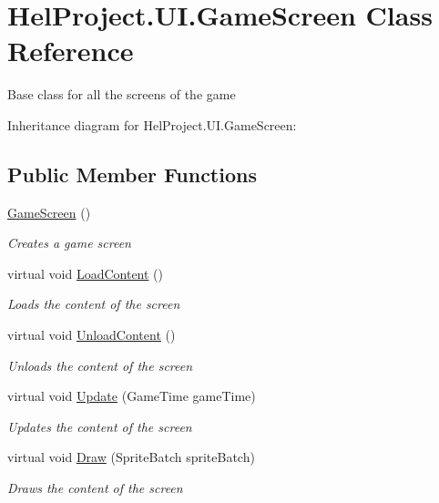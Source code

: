 \hypertarget{class_hel_project_1_1_u_i_1_1_game_screen}{}\section{Hel\+Project.\+U\+I.\+Game\+Screen Class Reference}
\label{class_hel_project_1_1_u_i_1_1_game_screen}


Base class for all the screens of the game  




Inheritance diagram for Hel\+Project.\+U\+I.\+Game\+Screen\+:
\subsection*{Public Member Functions}
\begin{DoxyCompactItemize}
\item 
\hyperlink{class_hel_project_1_1_u_i_1_1_game_screen_a2061db8e78d29a972883b7e3fb47d71c}{Game\+Screen} ()
\begin{DoxyCompactList}\small\item\em Creates a game screen \end{DoxyCompactList}\item 
virtual void \hyperlink{class_hel_project_1_1_u_i_1_1_game_screen_aa4e15890ede3b8da390ffe0cecff3703}{Load\+Content} ()
\begin{DoxyCompactList}\small\item\em Loads the content of the screen \end{DoxyCompactList}\item 
virtual void \hyperlink{class_hel_project_1_1_u_i_1_1_game_screen_a97560de3aeb8b283fca89c1682ec778f}{Unload\+Content} ()
\begin{DoxyCompactList}\small\item\em Unloads the content of the screen \end{DoxyCompactList}\item 
virtual void \hyperlink{class_hel_project_1_1_u_i_1_1_game_screen_a4aefe31814b0081be3ba4f1243b8cee6}{Update} (Game\+Time game\+Time)
\begin{DoxyCompactList}\small\item\em Updates the content of the screen \end{DoxyCompactList}\item 
virtual void \hyperlink{class_hel_project_1_1_u_i_1_1_game_screen_ace6f51c0a6c5206a5c58cefd0eba2797}{Draw} (Sprite\+Batch sprite\+Batch)
\begin{DoxyCompactList}\small\item\em Draws the content of the screen \end{DoxyCompactList}\end{DoxyCompactItemize}
